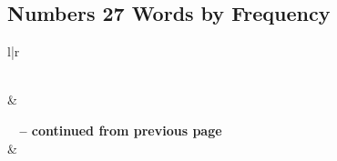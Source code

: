 

\subsection{Numbers 27 Words by Frequency}


\normalsize
 
\begin{center}
\begin{longtable}{l|r}
\caption[Numbers 27 Words by Frequency]{Numbers 27 Words by Frequency}\label{table:WordsbyFrequency for Numbers 27} \\
\hline {} &  \\ \hline 
\endfirsthead
 
{{\bfseries \tablename\ \thetable{} -- continued from previous page}} \\  
\hline {} &  \\ \hline 
\endhead
 

\end{longtable}
\end{center}
